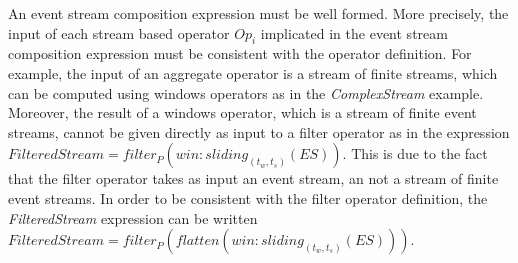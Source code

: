   
  An event stream composition expression must be well formed. More precisely, the input of each stream based operator $Op_i$ implicated in the event stream composition expression must be consistent with the operator definition. For example, the input of an aggregate operator is a stream of finite streams, which can be computed using windows operators as in the \textit{ComplexStream} example. Moreover, the result of a windows operator, which is a stream of finite event streams, cannot be given directly as input to a filter operator as in the expression $FilteredStream=filter_P(win:sliding_{(t_w,t_s)}(ES))$. 
  This is due to the fact that the filter operator takes as input an event stream, an not a stream of finite event streams. In order to be consistent with the filter operator definition, the \textit{FilteredStream} expression can be written $FilteredStream=filter_P(flatten(win:sliding_{(t_w,t_s)}(ES)))$.    
